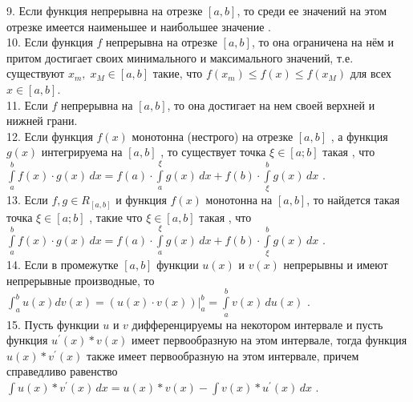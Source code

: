 \documentclass[12pt]{article}
\begin{document}
9. Если функция непрерывна на отрезке  ${\displaystyle [a,b]}$, то среди ее значений на этом отрезке имеется наименьшее и наибольшее значение .\\

10. Если функция ${\displaystyle f}$ непрерывна на отрезке ${\displaystyle [a,b]}$, то она ограничена на нём и притом достигает своих минимального и максимального значений, т.е. существуют ${\displaystyle x_{m},\;x_{M}\in [a,b]}$ такие, что ${\displaystyle f(x_{m})\leq f(x)\leq f(x_{M})}$ для всех ${\displaystyle x\in [a,b]}$.\\

11. Если ${\displaystyle f}$ непрерывна на ${\displaystyle [a,b]}$, то она достигает на нем своей верхней и нижней грани.\\

12. Если функция ${\displaystyle f(x)}$ монотонна (нестрого) на отрезке ${\displaystyle [a,b]}$ , а функция ${\displaystyle g(x)}$ интегрируема на ${\displaystyle [a,b]}$ , то существует точка  ${\displaystyle \xi \in [a;b]}$ такая , что ${\displaystyle \int \limits _{a}^{b} f(x)\cdot g(x)\, dx=f(a)\cdot \int \limits _{a}^{\xi} g(x)\, dx+f(b)\cdot \int \limits _{\xi}^{b} g(x)\, dx }$ .\\

13. Если ${\displaystyle f,g \in R_{[a,b]}}$ и функция ${\displaystyle f(x)}$ монотонна на ${\displaystyle [a,b]}$, то найдется такая точка ${\displaystyle \xi \in [a;b]}$ , такие что ${\displaystyle \xi \in [a,b]}$ такая , что ${\displaystyle \int \limits _{a}^{b} f(x)\cdot g(x)\, dx=f(a)\cdot \int \limits _{a}^{\xi} g(x)\, dx+f(b)\cdot \int \limits _{\xi}^{b} g(x)\, dx }$ .\\

14. Если в промежутке  ${\displaystyle [a,b]}$ функции ${\displaystyle u(x)}$ и  ${\displaystyle v(x)}$ непрерывны и имеют непрерывные производные, то ${\displaystyle \int _{a}^{b} u(x)dv(x)=(u(x)\cdot v(x)){\vert}^{b}_{a}=\int \limits _{a}^{b} v(x)\, du(x)}$ .\\

15. Пусть функции ${\displaystyle u}$ и ${\displaystyle v}$ дифференцируемы на некотором интервале и пусть функция ${\displaystyle u^{\prime}(x)*v(x)}$ имеет первообразную на этом интервале, тогда функция ${\displaystyle u(x)*v^{\prime}(x)}$ также имеет первообразную на этом интервале, причем справедливо равенство ${\displaystyle \int \limits u(x)*v^{\prime}(x) \, dx=u(x)*v(x)-\int \limits v(x)*u^{\prime}(x)\, dx}$ .\\
\end{document}
